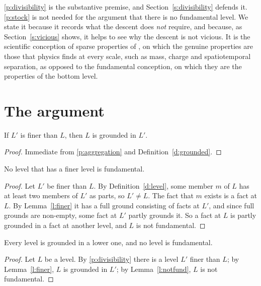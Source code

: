 \documentclass{situationist-preprint}
\begin{document}
\ref{p:divisibility} is the substantive premise, and Section~\ref{s:divisibility} defends it. \ref{p:stock} is not needed for the argument that there is no fundamental level. We state it because it records what the descent does \emph{not} require, and because, as Section~\ref{s:vicious} shows, it helps to see why the descent is not vicious. It is the scientific conception of sparse properties of \citet{Schaffer2004}, on which the genuine properties are those that physics finds at every scale, such as mass, charge and spatiotemporal separation, as opposed to the fundamental conception, on which they are the properties of the bottom level.

\section{The argument}\label{s:argument}

\begin{lemma}\label{l:finer}
If $L'$ is finer than $L$, then $L$ is grounded in $L'$.
\end{lemma}

\begin{proof}
Immediate from \ref{p:aggregation} and Definition~\ref{d:grounded}.
\end{proof}

\begin{lemma}\label{l:notfund}
No level that has a finer level is fundamental.
\end{lemma}

\begin{proof}
Let $L'$ be finer than $L$. By Definition~\ref{d:level}, some member $m$ of $L$ has at least two members of $L'$ as parts, so $L' \neq L$. The fact that $m$ exists is a fact at $L$. By Lemma~\ref{l:finer} it has a full ground consisting of facts at $L'$, and since full grounds are non-empty, some fact at $L'$ partly grounds it. So a fact at $L$ is partly grounded in a fact at another level, and $L$ is not fundamental.
\end{proof}

\begin{theorem}\label{t:nofund}
Every level is grounded in a lower one, and no level is fundamental.
\end{theorem}

\begin{proof}
Let $L$ be a level. By \ref{p:divisibility} there is a level $L'$ finer than $L$; by Lemma~\ref{l:finer}, $L$ is grounded in $L'$; by Lemma~\ref{l:notfund}, $L$ is not fundamental.
\end{proof}
\end{document}
